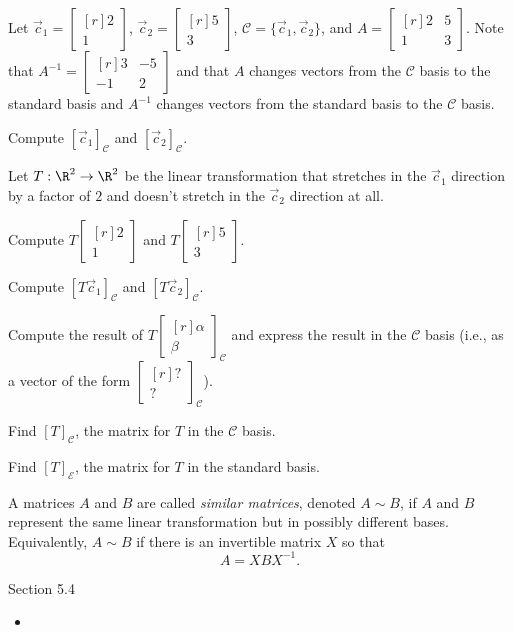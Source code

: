 \documentclass{problemset}
\newcommand{\mat}[1]{\begin{bmatrix*}[r]#1\end{bmatrix*}}
\begin{document}
	\question
	Let $\vec c_1=\mat{2\\1}$, $\vec c_2=\mat{5\\3}$, $\mathcal C=\{\vec c_1,\vec c_2\}$, and $A=\mat{2&5\\1&3}$.
	Note that $A^{-1}=\mat{3&-5\\-1&2}$ and that $A$ changes vectors from the $\mathcal C$ basis to the standard
	basis and $A^{-1}$ changes vectors from the standard basis to the $\mathcal C$ basis.
	\begin{parts}
		\item Compute $[\vec c_1]_{\mathcal C}$ and $[\vec c_2]_{\mathcal C}$.
	\end{parts}
	Let $T:\R^2\to\R^2$ be the linear transformation that stretches in the $\vec c_1$ direction by a factor of $2$
	and doesn't stretch in the $\vec c_2$ direction at all.
	\begin{parts}[resume]
		\item Compute $T\mat{2\\1}$ and $T\mat{5\\3}$.
		\item Compute $[T\vec c_1]_{\mathcal C}$ and $[T\vec c_2]_{\mathcal C}$.
		\item Compute the result of $T\mat{\alpha\\\beta}_{\mathcal C}$ and express the result in the
			$\mathcal C$ basis (i.e., as a vector of the form $\mat{?\\?}_{\mathcal C}$).
		\item Find $[T]_{\mathcal C}$, the matrix for $T$ in the $\mathcal C$ basis.
		\item Find $[T]_{\mathcal E}$, the matrix for $T$ in the standard basis.
	\end{parts}
	\begin{definition}
		A matrices $A$ and $B$ are called \emph{similar matrices}, denoted $A\sim B$, if
		$A$ and $B$ represent the same linear transformation but in possibly different bases.
		Equivalently, $A\sim B$ if there is an invertible matrix $X$ so that
		\[
			A=XBX^{-1}.
		\]
	\end{definition}



	
\begin{lesson}
	\newpage

	Section 5.4

	\begin{itemize}
		\item 
	\end{itemize}


	\newpage
\end{lesson}
\newpage
\end{document}
